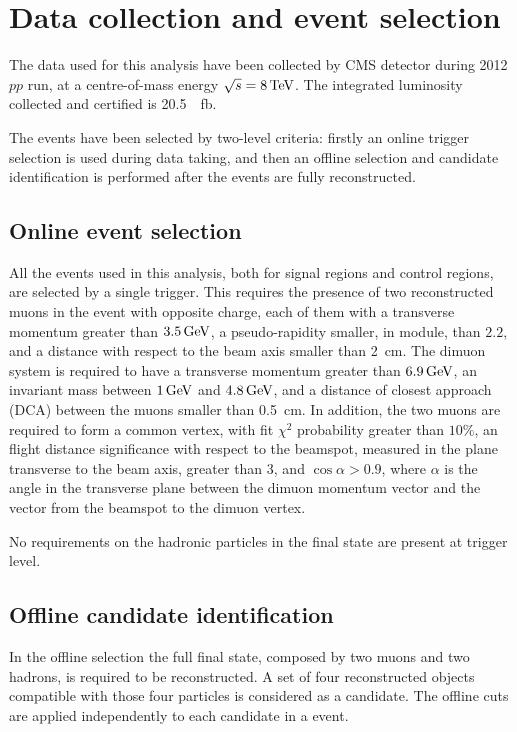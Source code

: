 \section{Data collection and event selection}\label{sec:selection}

The data used for this analysis have been collected by CMS detector during 2012 $pp$ run, at a centre-of-mass energy $\sqrt{s}=8\,\textrm{TeV}$.
The integrated luminosity collected and certified is \SI{20.5}{\per\femto\barn}.

The events have been selected by two-level criteria: firstly an online trigger selection is used during data taking, and then an offline selection and candidate identification is performed after the events are fully reconstructed.

\subsection{Online event selection}
\label{sec:onsel}
All the events used in this analysis, both for signal regions and control regions, are selected by a single trigger. This requires the presence of two reconstructed muons in the event with opposite charge, each of them with a transverse momentum greater than $3.5\,\textrm{GeV}$, a pseudo-rapidity smaller, in module, than $2.2$, and a distance with respect to the beam axis smaller than \SI{2}{\centi\metre}. The dimuon system is required to have a transverse momentum greater than $6.9\,\textrm{GeV}$, an invariant mass between $1\,\textrm{GeV}$ and $4.8\,\textrm{GeV}$, and a distance of closest approach (DCA) between the muons smaller than \SI{0.5}{\centi\metre}. In addition, the two muons are required to form a common vertex, with fit $\chi^2$ probability greater than $10\%$, an flight distance significance with respect to the beamspot, measured in the plane transverse to the beam axis, greater than 3, and $\cos{\alpha}>0.9$, where $\alpha$ is the angle in the transverse plane between the dimuon momentum vector and the vector from the beamspot to the dimuon vertex.

No requirements on the hadronic particles in the final state are present at trigger level.

\subsection{Offline candidate identification}
\label{sec:offsel}

In the offline selection the full final state, composed by two muons and two hadrons, is required to be reconstructed. A set of four reconstructed objects compatible with those four particles is considered as a candidate. The offline cuts are applied independently to each candidate in a event.

